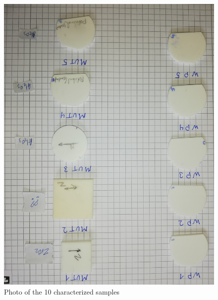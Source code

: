 \begin{figure}
    \centering
    \includegraphics[scale=0.1,angle=180,origin=c]{images/7_appendix/ceramic_samples.jpg}
    \caption{Photo of the 10 characterized samples}
    \label{fig:ceramic_samples}
\end{figure}

